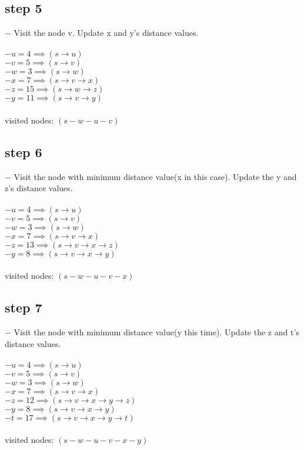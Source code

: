 \documentclass[12pt]{article}
\begin{document}
\subsection*{step 5}
	$-$ Visit the node v. Update x and y's distance values.\\
	\\
	$-$$u = 4 \implies (s \rightarrow u)$\\
	$-$$v = 5 \implies (s \rightarrow v)$\\
	$-$$w = 3 \implies (s \rightarrow w)$\\
	$-$$x = 7 \implies (s \rightarrow v \rightarrow x)$\\
	$-$$z = 15 \implies (s \rightarrow w \rightarrow z)$\\
	$-$$y = 11 \implies (s \rightarrow v \rightarrow y)$\\
	\\
	visited nodes: $(s-w-u-v)$\\

\subsection*{step 6}
	$-$ Visit the node with minimum distance value(x in this case). Update the y and z's distance values.\\
	\\
	$-$$u = 4 \implies (s \rightarrow u)$\\
	$-$$v = 5 \implies (s \rightarrow v)$\\
	$-$$w = 3 \implies (s \rightarrow w)$\\
	$-$$x = 7 \implies (s \rightarrow v \rightarrow x)$\\
	$-$$z = 13 \implies (s \rightarrow v \rightarrow x \rightarrow z)$\\
	$-$$y = 8 \implies (s \rightarrow v \rightarrow x \rightarrow y)$\\
	\\
	visited nodes: $(s-w-u-v-x)$\\

\subsection*{step 7}
	$-$ Visit the node with minimum distance value(y this time). Update the z and t's distance values.\\
	\\
	$-$$u = 4 \implies (s \rightarrow u)$\\
	$-$$v = 5 \implies (s \rightarrow v)$\\
	$-$$w = 3 \implies (s \rightarrow w)$\\
	$-$$x = 7 \implies (s \rightarrow v \rightarrow x)$\\
	$-$$z = 12 \implies (s \rightarrow v \rightarrow x \rightarrow y \rightarrow z)$\\
	$-$$y = 8 \implies (s \rightarrow v \rightarrow x \rightarrow y)$\\
	$-$$t = 17 \implies (s \rightarrow v \rightarrow x \rightarrow y \rightarrow t)$\\
	\\
	visited nodes: $(s-w-u-v-x-y)$\\
\end{document}
